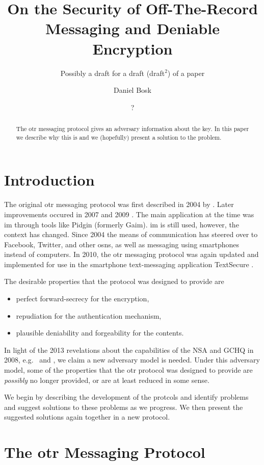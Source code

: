 \documentclass[draft]{llncs}
\title{%
  On the Security of Off-The-Record Messaging
  and Deniable Encryption
}
\subtitle{%
  Possibly a draft for a draft (draft\(^2\)) of a paper
}
\author{%
  Daniel Bosk
  \and
  ?
}
\institute{%
  School of Computer Science and Communication\\
  KTH Royal Institute of Technology, SE-100\,44 Stockholm, Sweden\\
  \email{\{dbosk,?\}@kth.se}
}
\begin{document}
\maketitle
\begin{abstract}
  The \ac{otr} messaging protocol gives an adversary information about the key.
  In this paper we describe why this is and we (hopefully) present a solution 
  to the problem.
\end{abstract}


\acresetall
\section{Introduction}

The original \ac{otr} messaging protocol was first described in 2004 by 
\citeauthor{otr2004} \cite{otr2004}.
Later improvements occured in 2007 \cite{otr2007} and 2009 \cite{multiotr2009}.
The main application at the time was \ac{im} through tools like Pidgin 
\cite{pidgin} (formerly Gaim).
\ac{im} is still used, however, the context has changed.
Since 2004 the means of communication has steered over to Facebook, Twitter, 
and other \acp{osn}, as well as messaging using smartphones instead of 
computers.
In 2010, the \ac{otr} messaging protocol was again updated and implemented for
use in the smartphone text-messaging application TextSecure \cite{textsecure}.

The desirable properties that the protocol was designed to provide are
\begin{itemize}
  \item perfect forward-secrecy for the encryption,
  \item repudiation for the authentication mechanism,
  \item plausible deniability and forgeability for the contents.
\end{itemize}
In light of the 2013 revelations about the capabilities of the NSA and GCHQ in 
2008, e.g.~\cite{nsa1} and \cite{nsa2}, we claim a new adversary model is 
needed.
Under this adversary model, some of the properties that the \ac{otr} protocol 
was designed to provide are \emph{possibly} no longer provided, or are at least 
reduced in some sense.

We begin by describing the development of the protcols and identify problems 
and suggest solutions to these problems as we progress.
We then present the suggested solutions again together in a new protocol.


\section{The \acs{otr} Messaging Protocol}
\end{document}
